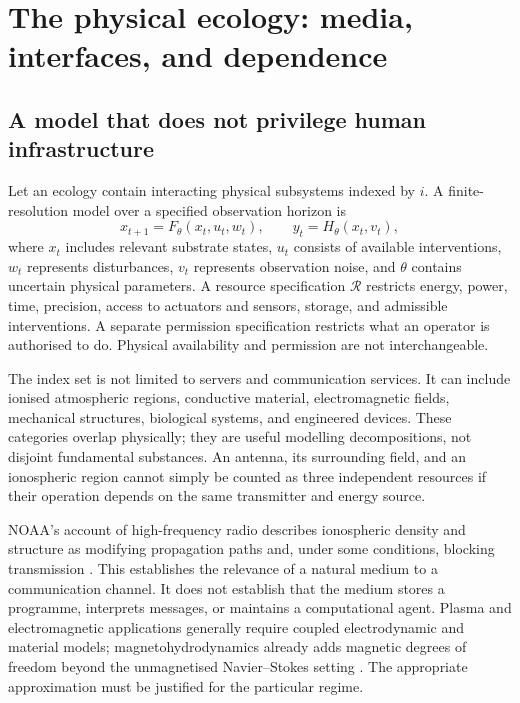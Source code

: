 \documentclass[11pt,a4paper]{article}
\theoremstyle{definition}
\theoremstyle{remark}
\newcommand{\calR}{\mathcal{R}}
\begin{document}




\section{The physical ecology: media, interfaces, and dependence}\label{sec:ecology}
\subsection{A model that does not privilege human infrastructure}
Let an ecology contain interacting physical subsystems indexed by $i$. A finite-resolution model over a specified observation horizon is
\begin{equation}\label{eq:ecology}
 x_{t+1}=F_\theta(x_t,u_t,w_t),\qquad y_t=H_\theta(x_t,v_t),
\end{equation}
where $x_t$ includes relevant substrate states, $u_t$ consists of available interventions, $w_t$ represents disturbances, $v_t$ represents observation noise, and $\theta$ contains uncertain physical parameters. A resource specification $\calR$ restricts energy, power, time, precision, access to actuators and sensors, storage, and admissible interventions. A separate permission specification restricts what an operator is authorised to do. Physical availability and permission are not interchangeable.

The index set is not limited to servers and communication services. It can include ionised atmospheric regions, conductive material, electromagnetic fields, mechanical structures, biological systems, and engineered devices. These categories overlap physically; they are useful modelling decompositions, not disjoint fundamental substances. An antenna, its surrounding field, and an ionospheric region cannot simply be counted as three independent resources if their operation depends on the same transmitter and energy source.

NOAA's account of high-frequency radio describes ionospheric density and structure as modifying propagation paths and, under some conditions, blocking transmission \citep{noaa}. This establishes the relevance of a natural medium to a communication channel. It does not establish that the medium stores a programme, interprets messages, or maintains a computational agent. Plasma and electromagnetic applications generally require coupled electrodynamic and material models; magnetohydrodynamics already adds magnetic degrees of freedom beyond the unmagnetised Navier--Stokes setting \citep{lei}. The appropriate approximation must be justified for the particular regime.
\end{document}
